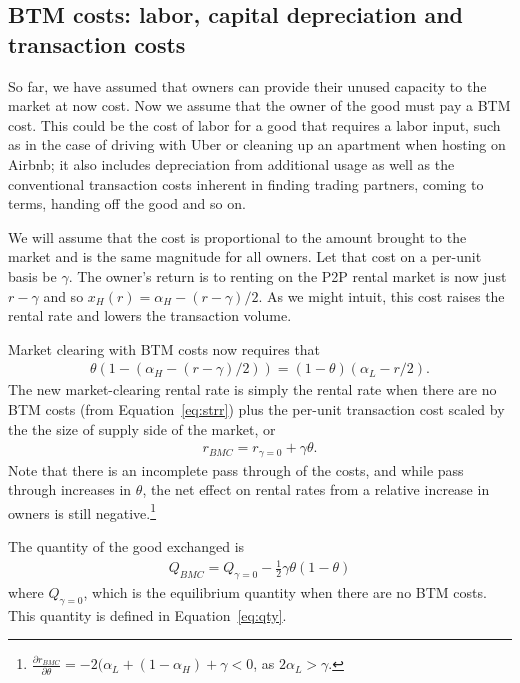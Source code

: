 \documentclass[11pt]{article}
\begin{document}
\subsection{BTM costs: labor, capital depreciation and transaction costs}

So far, we have assumed that owners can provide their unused capacity to the market at now cost. 
Now we assume that the owner of the good must pay a BTM cost. 
This could be the cost of labor for a good that requires a labor input, such as in the case of driving with Uber or cleaning up an apartment when hosting on Airbnb;
it also includes depreciation from additional usage as well as the conventional transaction costs inherent in finding trading partners, coming to terms, handing off the good and so on.  

We will assume that the cost is proportional to the amount brought to the market and is the same magnitude for all owners.
Let that cost on a per-unit basis be $\gamma$. 
The owner's return is to renting on the P2P rental market is now just $r - \gamma$ and so $x_H(r) = \alpha_H - (r - \gamma)/2$.
As we might intuit, this cost raises the rental rate and lowers the transaction volume. 

Market clearing with BTM costs now requires that 
\begin{align}
  \theta (1 - (\alpha_H - (r-\gamma)/2)) = (1-\theta)(\alpha_L - r/2).
\end{align}
The new market-clearing rental rate is simply the rental rate when there are no BTM costs (from Equation~\ref{eq:strr}) plus the per-unit transaction cost scaled by the the size of supply side of the market, or  
\begin{align} \label{eq:rental_rate_sr_bmc}
  r_{BMC} = r_{\gamma = 0} + \gamma \theta. 
\end{align}
Note that there is an incomplete pass through of the costs, and while pass through increases in $\theta$, the net effect on rental rates from a relative increase in owners is still negative.\footnote{
  $\frac{\partial r_{BMC}}{\partial \theta} = -2(\alpha_L + (1-\alpha_H) + \gamma < 0$, as $2\alpha_L > \gamma$.}

The quantity of the good exchanged is
\begin{align} \label{eq:qty_gamma}
  Q_{BMC} = Q_{\gamma = 0} - \frac{1}{2} \gamma \theta (1-\theta)
\end{align} 
where $Q_{\gamma = 0}$, which is the equilibrium quantity when there are no BTM costs.
This quantity is defined in Equation~\ref{eq:qty}. 
\end{document}
